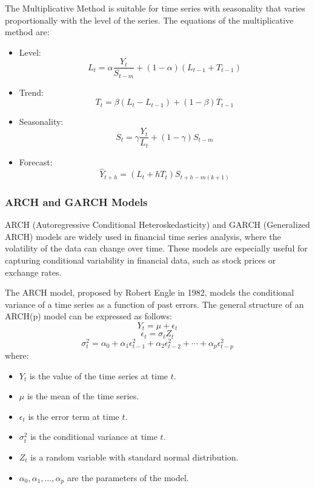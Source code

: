 The Multiplicative Method is suitable for time series with seasonality that varies proportionally with the level of the series. The equations of the multiplicative method are:

\begin{itemize}
    \item Level:
    \[
    L_t = \alpha \frac{Y_t}{S_{t-m}} + (1-\alpha)(L_{t-1} + T_{t-1})
    \]
    \item Trend:
    \[
    T_t = \beta (L_t - L_{t-1}) + (1-\beta) T_{t-1}
    \]
    \item Seasonality:
    \[
    S_t = \gamma \frac{Y_t}{L_t} + (1-\gamma) S_{t-m}
    \]
    \item Forecast:
    \[
    \hat{Y}_{t+h} = (L_t + h T_t) S_{t+h-m(k+1)}
    \]
\end{itemize}
\vspace{10pt}

\subsubsection{ARCH and GARCH Models}

ARCH (Autoregressive Conditional Heteroskedasticity) and GARCH (Generalized ARCH) models are widely used in financial time series analysis, where the volatility of the data can change over time. These models are especially useful for capturing conditional variability in financial data, such as stock prices or exchange rates.
\vspace{10pt}

The ARCH model, proposed by Robert Engle in 1982, models the conditional variance of a time series as a function of past errors. The general structure of an ARCH(p) model can be expressed as follows:
\[
Y_t = \mu + \epsilon_t
\]
\[
\epsilon_t = \sigma_t Z_t
\]
\[
\sigma_t^2 = \alpha_0 + \alpha_1 \epsilon_{t-1}^2 + \alpha_2 \epsilon_{t-2}^2 + \cdots + \alpha_p \epsilon_{t-p}^2
\]
where:
\begin{itemize}
    \item \( Y_t \) is the value of the time series at time \( t \).
    \item \( \mu \) is the mean of the time series.
    \item \( \epsilon_t \) is the error term at time \( t \).
    \item \( \sigma_t^2 \) is the conditional variance at time \( t \).
    \item \( Z_t \) is a random variable with standard normal distribution.
    \item \( \alpha_0, \alpha_1, \ldots, \alpha_p \) are the parameters of the model.
\end{itemize}

